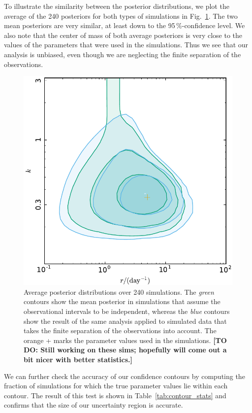 \documentclass[fleqn,usenatbib]{mnras}
\begin{document}
To illustrate the similarity between the posterior distributions, we plot the average of the 240 posteriors for both types of simulations in Fig.~\ref{fig:finiteness}. The two mean posteriors are very similar, at least down to the 95\,\%-confidence level. We also note that the center of mass of both average posteriors is very close to the values of the parameters that were used in the simulations. Thus we see that our analysis is unbiased, even though we are neglecting the finite separation of the observations.

\begin{figure}
	\includegraphics[width=1.0\columnwidth]{finiteness.pdf}
	\caption{\label{fig:finiteness}Average posterior distributions over 240 simulations. The \emph{green} contours show the mean posterior in simulations that assume the observational intervals to be independent, whereas the \emph{blue} contours show the result of the same analysis applied to simulated data that takes the finite separation of the observations into account. The orange + marks the parameter values used in the simulations. \textbf{[TO DO: Still working on these sims; hopefully will come out a bit nicer with better statistics.]}}
\end{figure}

We can further check the accuracy of our confidence contours by computing the fraction of simulations for which the true parameter values lie within each contour. The result of this test is shown in Table~\ref{tab:contour_stats} and confirms that the size of our uncertainty region is accurate.
\end{document}
